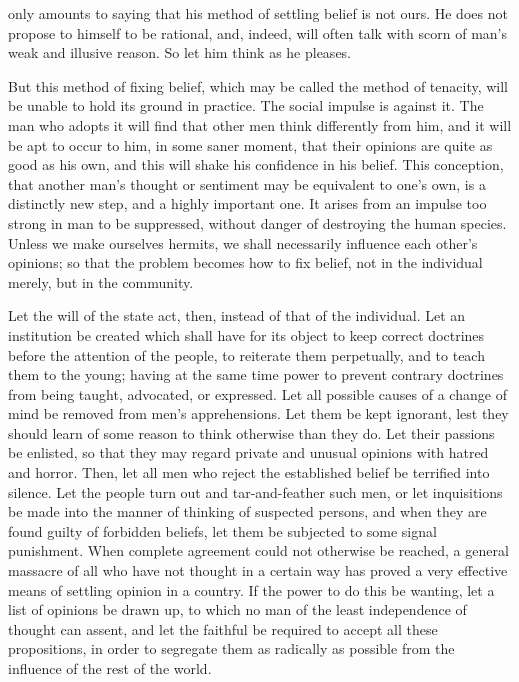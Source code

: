 \documentclass[]{article}
\begin{document}
only amounts to saying that his method of settling belief is not ours. He does not propose to himself to be rational, and, indeed, will often talk with scorn of man's weak and illusive reason. So let him think as he pleases.

But this method of fixing belief, which may be called the method of tenacity, will be unable to hold its ground in practice. The social impulse is against it. The man who adopts it will find that other men think differently from him, and it will be apt to occur to him, in some saner moment, that their opinions are quite as good as his own, and this will shake his confidence in his belief. This conception, that another man's thought or sentiment may be equivalent to one's own, is a distinctly new step, and a highly important one. It arises from an impulse too strong in man to be suppressed, without danger of destroying the human species. Unless we make ourselves hermits, we shall necessarily influence each other's opinions; so that the problem becomes how to fix belief, not in the individual merely, but in the community.

Let the will of the state act, then, instead of that of the individual. Let an institution be created which shall have for its object to keep correct doctrines before the attention of the people, to reiterate them perpetually, and to teach them to the young; having at the same time power to prevent contrary doctrines from being taught, advocated, or expressed. Let all possible causes of a change of mind be removed from men's apprehensions. Let them be kept ignorant, lest they should learn of some reason to think otherwise than they do. Let their passions be enlisted, so that they may regard private and unusual opinions with hatred and horror. Then, let all men who reject the established belief be terrified into silence. Let the people turn out and tar-and-feather such men, or let inquisitions be made into the manner of thinking of suspected persons, and when they are found guilty of forbidden beliefs, let them be subjected to some signal punishment. When complete agreement could not otherwise be reached, a general massacre of all who have not thought in a certain way has proved a very effective means of settling opinion in a country. If the power to do this be wanting, let a list of opinions be drawn up, to which no man of the least independence of thought can assent, and let the faithful be required to accept all these propositions, in order to segregate them as radically as possible from the influence of the rest of the world.
\end{document}
